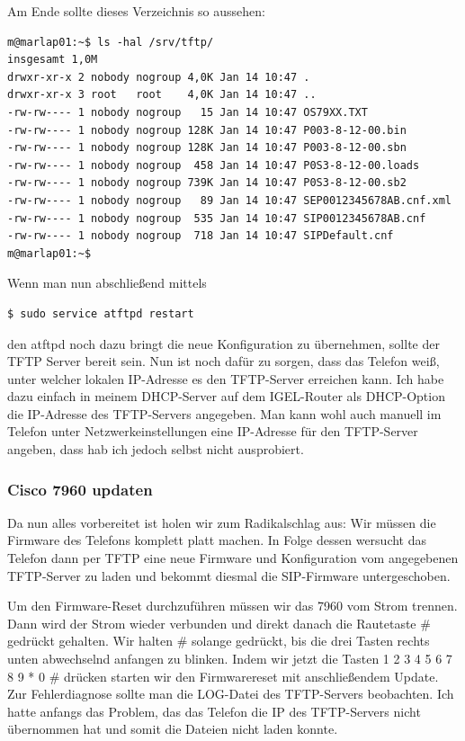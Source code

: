 \documentclass[a4paper,12pt]{scrbook}
\begin{document}
Am Ende sollte dieses Verzeichnis so aussehen:

\begin{lstlisting}
m@marlap01:~$ ls -hal /srv/tftp/
insgesamt 1,0M
drwxr-xr-x 2 nobody nogroup 4,0K Jan 14 10:47 .
drwxr-xr-x 3 root   root    4,0K Jan 14 10:47 ..
-rw-rw---- 1 nobody nogroup   15 Jan 14 10:47 OS79XX.TXT
-rw-rw---- 1 nobody nogroup 128K Jan 14 10:47 P003-8-12-00.bin
-rw-rw---- 1 nobody nogroup 128K Jan 14 10:47 P003-8-12-00.sbn
-rw-rw---- 1 nobody nogroup  458 Jan 14 10:47 P0S3-8-12-00.loads
-rw-rw---- 1 nobody nogroup 739K Jan 14 10:47 P0S3-8-12-00.sb2
-rw-rw---- 1 nobody nogroup   89 Jan 14 10:47 SEP0012345678AB.cnf.xml
-rw-rw---- 1 nobody nogroup  535 Jan 14 10:47 SIP0012345678AB.cnf
-rw-rw---- 1 nobody nogroup  718 Jan 14 10:47 SIPDefault.cnf
m@marlap01:~$ 
\end{lstlisting}
Wenn man nun abschließend mittels

\begin{lstlisting}
$ sudo service atftpd restart
\end{lstlisting}

den atftpd noch dazu bringt die neue Konfiguration zu übernehmen, sollte der TFTP Server bereit sein. Nun ist noch dafür zu sorgen,
dass das Telefon weiß, unter welcher lokalen IP-Adresse es den TFTP-Server erreichen kann. Ich habe dazu einfach in meinem DHCP-Server
auf dem IGEL-Router als DHCP-Option die IP-Adresse des TFTP-Servers angegeben. Man kann wohl auch manuell im Telefon unter Netzwerkeinstellungen
eine IP-Adresse für den TFTP-Server angeben, dass hab ich jedoch selbst nicht ausprobiert.

\subsubsection{Cisco 7960 updaten}
Da nun alles vorbereitet ist holen wir zum Radikalschlag aus: Wir müssen die Firmware des Telefons komplett platt machen. In Folge dessen wersucht das
Telefon dann per TFTP eine neue Firmware und Konfiguration vom angegebenen TFTP-Server zu laden und bekommt diesmal die SIP-Firmware untergeschoben.

Um den Firmware-Reset durchzuführen müssen wir das 7960 vom Strom trennen. Dann wird der Strom wieder verbunden und direkt danach die Rautetaste \# gedrückt gehalten.
Wir halten \# solange gedrückt, bis die drei Tasten rechts unten abwechselnd anfangen zu blinken. Indem wir jetzt die Tasten 1 2 3 4 5 6 7 8 9 * 0 \# drücken starten wir den
Firmwarereset mit anschließendem Update. Zur Fehlerdiagnose sollte man die LOG-Datei des TFTP-Servers beobachten. Ich hatte anfangs das Problem, das das Telefon die IP des TFTP-Servers
nicht übernommen hat und somit die Dateien nicht laden konnte. 
\end{document}
